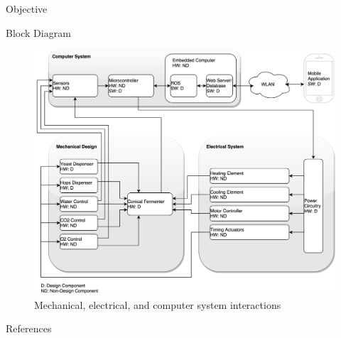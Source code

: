 \documentclass[final]{beamer}
\newlength{\onecolwid}
\begin{document}
\begin{frame}[t]
\begin{columns}[t]
\begin{column}{\onecolwid}
\begin{block}{Objective}
\end{block}


\begin{block}{Block Diagram}

\begin{figure}
\includegraphics[width=\linewidth]{block-diagram.png}
\caption{Mechanical, electrical, and computer system interactions}
\end{figure}

\end{block}


\begin{block}{References}

\nocite{*} %
\small{
\vspace{0.75in}}

\end{block}




\end{column}
\end{columns}
\end{frame}
\end{document}
